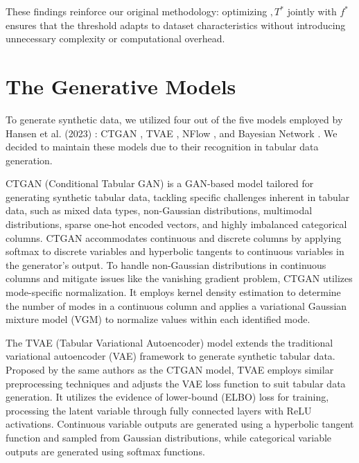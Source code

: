\documentclass{article}
\theoremstyle{plain}
\theoremstyle{definition}
\theoremstyle{remark}
\begin{document}
These findings reinforce our original methodology: optimizing 
$, T^*$  jointly with $f^*$ ensures that the threshold adapts to dataset characteristics without introducing unnecessary complexity or computational overhead.







\section{The Generative Models} \label{subsec:appendicebestparam}

To generate synthetic data, we utilized four out of the five models employed by Hansen et al. (2023) \cite{hansen2023reimagining}: CTGAN \cite{ctgan}, TVAE \cite{ctgan}, NFlow \cite{Kobyzev2021}, and Bayesian Network \cite{young2009using}. We decided to maintain these models due to their recognition in tabular data generation.

CTGAN (Conditional Tabular GAN) \cite{ctgan} is a GAN-based model tailored for generating synthetic tabular data, tackling specific challenges inherent in tabular data, such as mixed data types, non-Gaussian distributions, multimodal distributions, sparse one-hot encoded vectors, and highly imbalanced categorical columns. CTGAN accommodates continuous and discrete columns by applying softmax to discrete variables and hyperbolic tangents to continuous variables in the generator's output. To handle non-Gaussian distributions in continuous columns and mitigate issues like the vanishing gradient problem, CTGAN utilizes mode-specific normalization. It employs kernel density estimation to determine the number of modes in a continuous column and applies a variational Gaussian mixture model (VGM) to normalize values within each identified mode.

The TVAE (Tabular Variational Autoencoder) \cite{ctgan} model extends the traditional variational autoencoder (VAE) framework to generate synthetic tabular data. Proposed by the same authors as the CTGAN model, TVAE employs similar preprocessing techniques and adjusts the VAE loss function to suit tabular data generation. It utilizes the evidence of lower-bound (ELBO) loss for training, processing the latent variable through fully connected layers with ReLU activations. Continuous variable outputs are generated using a hyperbolic tangent function and sampled from Gaussian distributions, while categorical variable outputs are generated using softmax functions.
\end{document}
